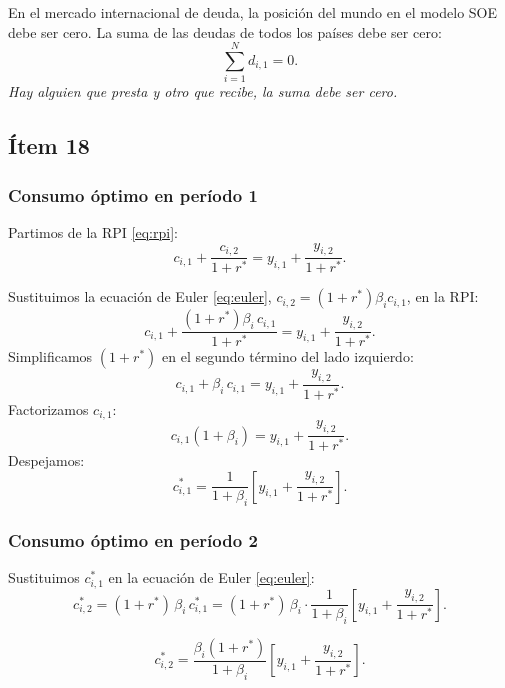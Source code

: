 \begin{condicion}
En el mercado internacional de deuda, la posición del mundo en el modelo
SOE debe ser cero. La suma de las deudas de todos los países debe ser cero:
\[
    \sum_{i=1}^{N} d_{i,1} = 0.
\]
\textit{Hay alguien que presta y otro que recibe, la suma debe ser cero.}
\end{condicion}

\subsection*{Ítem 18}

\subsubsection*{Consumo óptimo en período 1}

Partimos de la RPI \eqref{eq:rpi}:
\[
    c_{i,1} + \frac{c_{i,2}}{1+r^*} = y_{i,1} + \frac{y_{i,2}}{1+r^*}.
\]

Sustituimos la ecuación de Euler \eqref{eq:euler},
$c_{i,2} = (1+r^*)\beta_i c_{i,1}$, en la RPI:
\[
    c_{i,1} + \frac{(1+r^*)\beta_i\, c_{i,1}}{1+r^*}
    = y_{i,1} + \frac{y_{i,2}}{1+r^*}.
\]
Simplificamos $(1+r^*)$ en el segundo término del lado izquierdo:
\[
    c_{i,1} + \beta_i\, c_{i,1} = y_{i,1} + \frac{y_{i,2}}{1+r^*}.
\]
Factorizamos $c_{i,1}$:
\[
    c_{i,1}(1 + \beta_i) = y_{i,1} + \frac{y_{i,2}}{1+r^*}.
\]
Despejamos:
\begin{equation}\label{eq:c1}
    \boxed{c_{i,1}^* = \frac{1}{1+\beta_i}\left[y_{i,1} + \frac{y_{i,2}}{1+r^*}\right].}
    \tag{6}
\end{equation}

\subsubsection*{Consumo óptimo en período 2}

Sustituimos $c_{i,1}^*$ en la ecuación de Euler \eqref{eq:euler}:
\[
    c_{i,2}^* = (1+r^*)\,\beta_i\, c_{i,1}^*
    = (1+r^*)\,\beta_i \cdot \frac{1}{1+\beta_i}
      \left[y_{i,1} + \frac{y_{i,2}}{1+r^*}\right].
\]

\begin{equation}\label{eq:c2}
    \boxed{c_{i,2}^* = \frac{\beta_i(1+r^*)}{1+\beta_i}
    \left[y_{i,1} + \frac{y_{i,2}}{1+r^*}\right].}
    \tag{7}
\end{equation}

